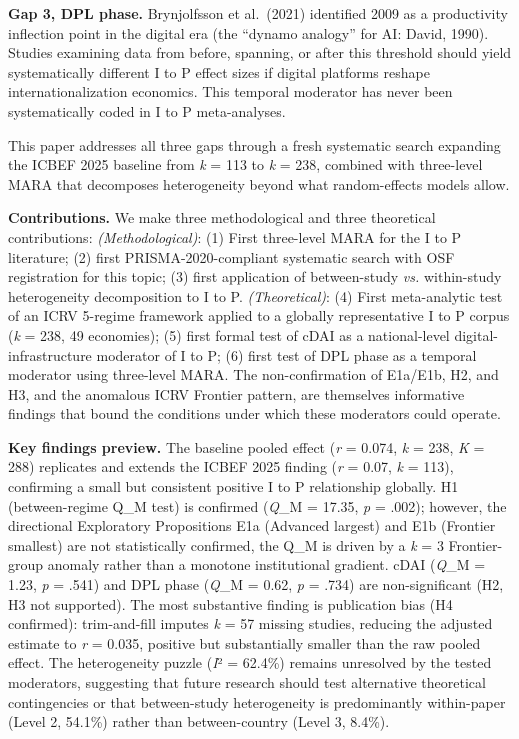 \documentclass[
  12pt,a4paper]{article}
\begin{document}
\textbf{Gap 3, DPL phase.} Brynjolfsson et al.~(2021) identified 2009 as
a productivity inflection point in the digital era (the ``dynamo
analogy'' for AI: David, 1990). Studies examining data from before,
spanning, or after this threshold should yield systematically different
I to P effect sizes if digital platforms reshape internationalization
economics. This temporal moderator has never been systematically coded
in I to P meta-analyses.

This paper addresses all three gaps through a fresh systematic search
expanding the ICBEF 2025 baseline from \emph{k} = 113 to \emph{k} = 238,
combined with three-level MARA that decomposes heterogeneity beyond what
random-effects models allow.

\textbf{Contributions.} We make three methodological and three
theoretical contributions: \emph{(Methodological)}: (1) First
three-level MARA for the I to P literature; (2) first
PRISMA-2020-compliant systematic search with OSF registration for this
topic; (3) first application of between-study \emph{vs.} within-study
heterogeneity decomposition to I to P. \emph{(Theoretical)}: (4) First
meta-analytic test of an ICRV 5-regime framework applied to a globally
representative I to P corpus (\emph{k} = 238, 49 economies); (5) first
formal test of cDAI as a national-level digital-infrastructure moderator
of I to P; (6) first test of DPL phase as a temporal moderator using
three-level MARA. The non-confirmation of E1a/E1b, H2, and H3, and the
anomalous ICRV Frontier pattern, are themselves informative findings
that bound the conditions under which these moderators could operate.

\textbf{Key findings preview.} The baseline pooled effect (\emph{r} =
0.074, \emph{k} = 238, \emph{K} = 288) replicates and extends the ICBEF
2025 finding (\emph{r} = 0.07, \emph{k} = 113), confirming a small but
consistent positive I to P relationship globally. H1 (between-regime
Q\_M test) is confirmed (\emph{Q}\_M = 17.35, \emph{p} = .002); however,
the directional Exploratory Propositions E1a (Advanced largest) and E1b
(Frontier smallest) are not statistically confirmed, the Q\_M is driven
by a \emph{k} = 3 Frontier-group anomaly rather than a monotone
institutional gradient. cDAI (\emph{Q}\_M = 1.23, \emph{p} = .541) and
DPL phase (\emph{Q}\_M = 0.62, \emph{p} = .734) are non-significant (H2,
H3 not supported). The most substantive finding is publication bias (H4
confirmed): trim-and-fill imputes \emph{k} = 57 missing studies,
reducing the adjusted estimate to \emph{r} = 0.035, positive but
substantially smaller than the raw pooled effect. The heterogeneity
puzzle (\emph{I}² = 62.4\%) remains unresolved by the tested moderators,
suggesting that future research should test alternative theoretical
contingencies or that between-study heterogeneity is predominantly
within-paper (Level 2, 54.1\%) rather than between-country (Level 3,
8.4\%).
\end{document}
